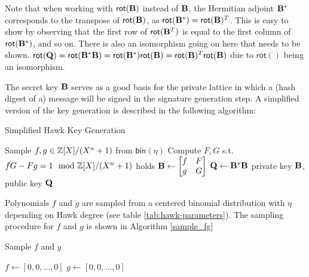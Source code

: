 Note that when working with $\mathsf{rot}(\mathbf{B})$ instead of $\mathbf{B}$, the Hermitian adjoint $\mathbf{B}^*$ corresponds to the transpose of $\mathsf{rot}(\mathbf{B})$, as 
$\mathsf{rot}(\mathbf{B}^*) = \mathsf{rot}(\mathbf{B})^T$. This is easy to show by observing that the first row of $\mathsf{rot}(\mathbf{B}^T)$ is equal to the first column of $\mathsf{rot}(\mathbf{B}^*)$, and so on. 
There is also an isomorphism going on here that needs to be shown.
$\mathsf{rot}(\mathbf{Q}) = \mathsf{rot}(\mathbf{B}^* \mathbf{B}) = \mathsf{rot}(\mathbf{B}^*) \mathsf{rot}(\mathbf{B}) = \mathsf{rot}(\mathbf{B})^T \mathsf{rot}(\mathbf{B})$ due to $\mathsf{rot}()$ being an isomorphism.

The secret key $\mathbf{B}$ serves as a good basis for the private lattice in which a (hash digest of a) message will be signed in the signature generation step.
A simplified version of the key generation is described in the following algorithm:
\begin{algorithm}[H]\label{Simplified Hawk Key Generation}
\caption{Simplified Hawk Key Generation}
\begin{algorithmic}[1]
    \State Sample $f, g \in \mathbb{Z}[X] / (X^n + 1)$ from $\mathsf{bin}(\eta)$
    \State Compute $F, G$ s.t. $fG - Fg = 1 \mod \bb{Z}[X] / (X^n + 1)$ holds
    \State $\mathbf{B} \gets \begin{bmatrix} f & F \\ g & G \end{bmatrix}$
    \State $\mathbf{Q} \gets \mathbf{B}^* \mathbf{B}$
    \State \Return private key $\mathbf{B}$, public key $\mathbf{Q}$
\end{algorithmic}
\end{algorithm}
Polynomials $f$ and $g$ are sampled from a centered binomial distribution with $\eta$ depending on Hawk degree (see table \ref{tab:hawk-parameters}).
The sampling procedure for $f$ and $g$ is shown in Algorithm \ref{sample_fg}
\begin{algorithm}[H]
\caption{Sample $f$ and $g$} \label{sample_fg}
\begin{algorithmic}[1]
    \State $f \gets [0, 0, ..., 0]$
    \State $g \gets [0, 0, ..., 0]$
\end{algorithmic}
\end{algorithm}
